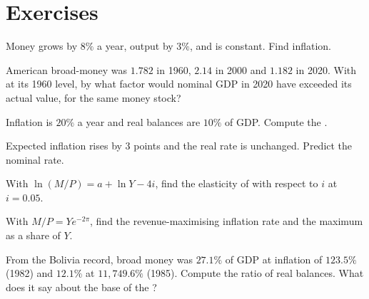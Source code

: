 \section*{Exercises}\label{sec:b1:money-and-inflation:exercises}

\begin{exercise}[$\star$]\label{exo:b1:money-and-inflation:qt}
Money grows by $8\%$ a year, output by $3\%$, and  is constant. Find
inflation.
\end{exercise}

\begin{exercise}[$\star$]\label{exo:b1:money-and-inflation:read}
American broad-money  was $1.782$ in 1960, $2.14$ in 2000 and $1.182$ in
2020. %
With  at its 1960 level, by what factor would nominal GDP in 2020
have exceeded its actual value, for the same money stock?
\end{exercise}

\begin{exercise}[$\star$]\label{exo:b1:money-and-inflation:seign}
Inflation is $20\%$ a year and real balances are $10\%$ of GDP. Compute the
.
\end{exercise}

\begin{exercise}[$\star$]\label{exo:b1:money-and-inflation:fisher-ex}
Expected inflation rises by 3 points and the real rate is unchanged. Predict
the nominal rate.
\end{exercise}

\begin{exercise}[$\star\star$]\label{exo:b1:money-and-inflation:elast}
With $\ln(M/P) = a + \ln Y - 4i$, find the elasticity of  with respect to $i$ at
$i = 0.05$.
\end{exercise}

\begin{exercise}[$\star\star$]\label{exo:b1:money-and-inflation:max}
With $M/P = Ye^{-2\pi}$, find the revenue-maximising inflation rate and the
maximum  as a share of $Y$.
\end{exercise}

\begin{exercise}[$\star\star$]\label{exo:b1:money-and-inflation:bolivia}
From the Bolivia record, broad money was $27.1\%$ of GDP at inflation of
$123.5\%$ (1982) and $12.1\%$ at $11{,}749.6\%$ (1985). %
Compute the ratio of real balances. What does it say about the base of the
?
\end{exercise}

